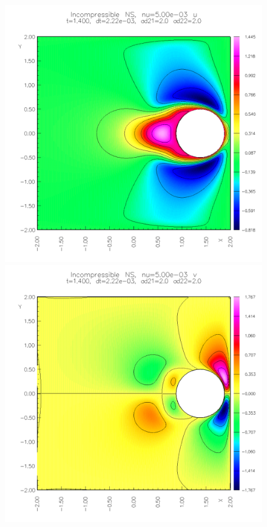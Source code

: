 {\begin{figure}
\begin{center}
\includegraphics[width=\figWidth]{figures/collide6-u-1p4}  
\includegraphics[width=\figWidth]{figures/collide6-v-1p4}  
%

\end{center}
\end{figure}}
